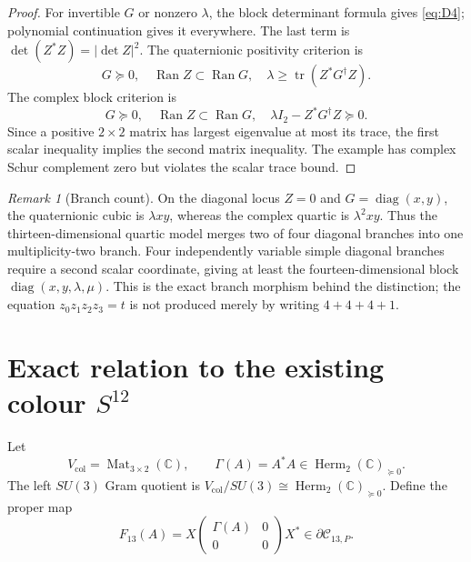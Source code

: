 \documentclass[11pt]{article}
\theoremstyle{definition}
\theoremstyle{remark}
\newtheorem{remark}[theorem]{Remark}
\newcommand{\C}{\mathbb C}
\newcommand{\Herm}{\operatorname{Herm}}
\newcommand{\Mat}{\operatorname{Mat}}
\newcommand{\tr}{\operatorname{tr}}
\newcommand{\Ran}{\operatorname{Ran}}
\newcommand{\diag}{\operatorname{diag}}
\newcommand{\cC}{\mathcal C}
\begin{document}
\begin{proof}
For invertible $G$ or nonzero $\lambda$, the block determinant formula gives \eqref{eq:D4}; polynomial continuation gives it everywhere.  The last term is
$\det(Z^*Z)=|\det Z|^2$.  The quaternionic positivity criterion is
\[
 G\succeq0,
 \quad\Ran Z\subset\Ran G,
 \quad\lambda\ge\tr(Z^*G^\dagger Z).
\]
The complex block criterion is
\[
 G\succeq0,
 \quad\Ran Z\subset\Ran G,
 \quad\lambda I_2-Z^*G^\dagger Z\succeq0.
\]
Since a positive $2\times2$ matrix has largest eigenvalue at most its trace, the first scalar inequality implies the second matrix inequality.  The example has complex Schur complement zero but violates the scalar trace bound.
\end{proof}

\begin{remark}[Branch count]
On the diagonal locus $Z=0$ and $G=\diag(x,y)$, the quaternionic cubic is
$\lambda xy$, whereas the complex quartic is $\lambda^2xy$.  Thus the thirteen-dimensional quartic model merges two of four diagonal branches into one multiplicity-two branch.  Four independently variable simple diagonal branches require a second scalar coordinate, giving at least the fourteen-dimensional block
$\diag(x,y,\lambda,\mu)$.  This is the exact branch morphism behind the distinction; the equation $z_0z_1z_2z_3=t$ is not produced merely by writing $4+4+4+1$.
\end{remark}

\section{Exact relation to the existing colour \texorpdfstring{$S^{12}$}{S12}}

Let
\begin{equation}\label{eq:colorV}
 V_{\mathrm{col}}=\Mat_{3\times2}(\C),
 \qquad
 \Gamma(A)=A^*A\in\Herm_2(\C)_{\succeq0}.
\end{equation}
The left $SU(3)$ Gram quotient is
$V_{\mathrm{col}}/SU(3)\cong\Herm_2(\C)_{\succeq0}$.
Define the proper map
\begin{equation}\label{eq:color-to-13}
 F_{13}(A)
 =X\begin{pmatrix}\Gamma(A)&0\\0&0\end{pmatrix}X^*
 \in\partial\cC_{13,P}.
\end{equation}
\end{document}
